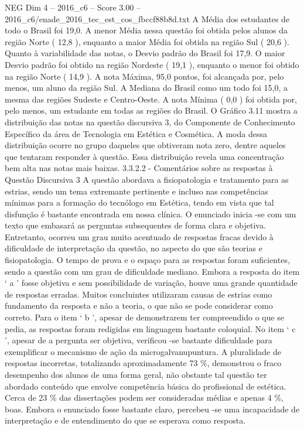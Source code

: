 \begin{textsample}{NEG Dim 4 – 2016\_c6 – Score 3.00 – 2016\_c6/enade\_2016\_tec\_est\_cos\_fbccf88b8d.txt}
A Média dos estudantes de todo o Brasil foi 19,0.
A menor Média nessa questão foi obtida pelos alunos da região Norte ( 12,8 ), enquanto a maior Média foi obtida na região Sul ( 20,6 ).
Quanto à variabilidade das notas, o Desvio padrão do Brasil foi 17,9.
O maior Desvio padrão foi obtido na região Nordeste ( 19,1 ), enquanto o menor foi obtido na região Norte ( 14,9 ).
A nota Máxima, 95,0 pontos, foi alcançada por, pelo menos, um aluno da região Sul.
A Mediana do Brasil como um todo foi 15,0, a mesma das regiões Sudeste e Centro-Oeste.
A nota Mínima ( 0,0 ) foi obtida por, pelo menos, um estudante em todas as regiões do Brasil.
O Gráfico 3.11 mostra a distribuição das notas na questão discursiva 3, do Componente de Conhecimento Específico da área de Tecnologia em Estética e Cosmética.
A moda dessa distribuição ocorre no grupo daqueles que obtiveram nota zero, dentre aqueles que tentaram responder à questão.
Essa distribuição revela uma concentração bem alta nas notas mais baixas. 3.3.2.2 - Comentários sobre as respostas à Questão Discursiva 3 A questão abordava a fisiopatologia e tratamento para as estrias, sendo um tema extremante pertinente e incluso nas competências mínimas para a formação do tecnólogo em Estética, tendo em vista que tal disfunção é bastante encontrada em nossa clínica.
O enunciado inicia -se com um texto que embasará as perguntas subsequentes de forma clara e objetiva.
Entretanto, ocorreu um grau muito acentuado de respostas fracas devido à dificuldade de interpretação da questão, no aspecto do que são teorias e fisiopatologia.
O tempo de prova e o espaço para as respostas foram suficientes, sendo a questão com um grau de dificuldade mediano.
Embora a resposta do item ‘ a ’ fosse objetiva e sem possibilidade de variação, houve uma grande quantidade de respostas erradas.
Muitos concluintes utilizaram causas de estrias como fundamento da resposta e não a teoria, o que não se pode considerar como correto.
Para o item ‘ b ’, apesar de demonstrarem ter compreendido o que se pedia, as respostas foram redigidas em linguagem bastante coloquial.
No item ‘ c ’, apesar de a pergunta ser objetiva, verificou -se bastante dificuldade para exemplificar o mecanismo de ação da microgalvanupuntura.
A pluralidade de respostas incorretas, totalizando aproximadamente 73 \%, demonstrou o fraco desempenho dos alunos de uma forma geral, não obstante tal questão ter abordado conteúdo que envolve competência básica do profissional de estética.
Cerca de 23 \% das dissertações podem ser consideradas médias e apenas 4 \%, boas.
Embora o enunciado fosse bastante claro, percebeu -se uma incapacidade de interpretação e de entendimento do que se esperava como resposta.

\end{textsample}
